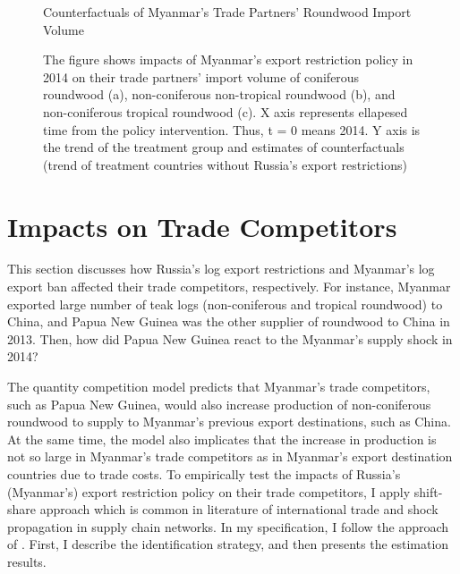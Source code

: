 \documentclass[a4paper,12pt]{article}
\begin{document}
\begin{figure}[htbp] 
    \centering
    \caption{Counterfactuals of Myanmar's Trade Partners' Roundwood Import Volume}
    \caption*{\small{The figure shows impacts of Myanmar's export restriction policy in 2014 on their trade partners' import volume of coniferous roundwood (a), non-coniferous non-tropical roundwood (b), and non-coniferous tropical roundwood (c). X axis represents ellapesed time from the policy intervention. Thus, t = 0 means 2014. Y axis is the trend of the treatment group and estimates of counterfactuals (trend of treatment countries without Russia's export restrictions)}}
    \label{fig:cf_imp_Myanmar}
\end{figure}

\section{Impacts on Trade Competitors}
This section discusses how Russia's log export restrictions and Myanmar's log export ban affected their trade competitors, respectively. For instance, Myanmar exported large number of teak logs (non-coniferous and tropical roundwood) to China, and Papua New Guinea was the other supplier of roundwood to China in 2013. Then, how did Papua New Guinea react to the Myanmar's supply shock in 2014? 

The quantity competition model predicts that Myanmar's trade competitors, such as Papua New Guinea, would also increase production of non-coniferous roundwood to supply to Myanmar's previous export destinations, such as China. At the same time, the model also implicates that the increase in production is not so large in Myanmar's trade competitors as in Myanmar's export destination countries due to trade costs. To empirically test the impacts of Russia's (Myanmar's) export restriction policy on their trade competitors, I apply shift-share approach which is common in literature of international trade and shock propagation in supply chain networks. In my specification, I follow the approach of \cite{huneeus2018production}. First, I describe the identification strategy, and then presents the estimation results.
\end{document}
